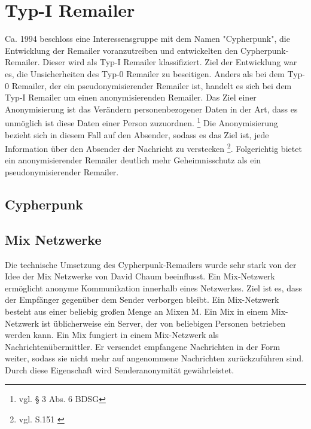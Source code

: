 \chapter{Typ-I Remailer}
Ca. 1994 beschloss eine Interessensgruppe mit dem Namen "Cypherpunk", die Entwicklung der Remailer voranzutreiben und entwickelten den Cypherpunk-Remailer. Dieser wird als Typ-I Remailer klassifiziert. Ziel der Entwicklung war es, die Unsicherheiten des Typ-0 Remailer zu beseitigen. 
Anders als bei dem Typ-0 Remailer, der ein pseudonymisierender Remailer ist, handelt es sich bei dem Typ-I Remailer um einen anonymisierenden Remailer. Das Ziel einer Anonymisierung ist das Verändern personenbezogener Daten in der Art, dass es unmöglich ist diese Daten einer Person zuzuordnen. \footnote {vgl. § 3 Abs. 6 BDSG}
Die Anonymisierung bezieht sich in diesem Fall auf den Absender, sodass es das Ziel ist, jede Information über den Absender der Nachricht zu verstecken \footnote{vgl. S.151 \cite{horster2013datenschutz}}. Folgerichtig bietet ein anonymisierender Remailer deutlich mehr Geheimnisschutz als ein pseudonymisierender Remailer. 


\section{Cypherpunk}

\section{Mix Netzwerke}
Die technische Umsetzung des Cypherpunk-Remailers wurde sehr stark von der Idee der Mix Netzwerke von David Chaum beeinflusst. Ein Mix-Netzwerk ermöglicht anonyme Kommunikation innerhalb eines Netzwerkes. Ziel ist es, dass der Empfänger gegenüber dem Sender verborgen bleibt.
Ein Mix-Netzwerk besteht aus einer beliebig großen Menge an Mixen M. Ein Mix in einem Mix-Netzwerk ist üblicherweise ein Server, der von beliebigen Personen betrieben werden kann. Ein Mix fungiert in einem Mix-Netzwerk als Nachrichtenübermittler. Er versendet empfangene Nachrichten in der Form weiter, sodass sie nicht mehr auf angenommene Nachrichten zurückzuführen sind. Durch diese Eigenschaft wird Senderanonymität gewährleistet.

